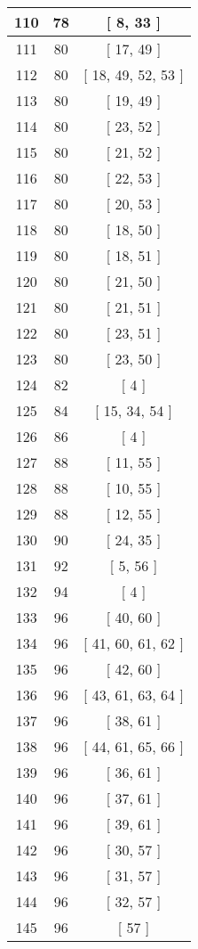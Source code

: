 \begin{center}
\begin{longtable}[H]{|| c c c ||}
\hline
110 & 78 & [ 8, 33 ] \\ 
\hline
111 & 80 & [ 17, 49 ] \\ 
\hline
112 & 80 & [ 18, 49, 52, 53 ] \\ 
\hline
113 & 80 & [ 19, 49 ] \\ 
\hline
114 & 80 & [ 23, 52 ] \\ 
\hline
115 & 80 & [ 21, 52 ] \\ 
\hline
116 & 80 & [ 22, 53 ] \\ 
\hline
117 & 80 & [ 20, 53 ] \\ 
\hline
118 & 80 & [ 18, 50 ] \\ 
\hline
119 & 80 & [ 18, 51 ] \\ 
\hline
120 & 80 & [ 21, 50 ] \\ 
\hline
121 & 80 & [ 21, 51 ] \\ 
\hline
122 & 80 & [ 23, 51 ] \\ 
\hline
123 & 80 & [ 23, 50 ] \\ 
\hline
124 & 82 & [ 4 ] \\ 
\hline
125 & 84 & [ 15, 34, 54 ] \\ 
\hline
126 & 86 & [ 4 ] \\ 
\hline
127 & 88 & [ 11, 55 ] \\ 
\hline
128 & 88 & [ 10, 55 ] \\ 
\hline
129 & 88 & [ 12, 55 ] \\ 
\hline
130 & 90 & [ 24, 35 ] \\ 
\hline
131 & 92 & [ 5, 56 ] \\ 
\hline
132 & 94 & [ 4 ] \\ 
\hline
133 & 96 & [ 40, 60 ] \\ 
\hline
134 & 96 & [ 41, 60, 61, 62 ] \\ 
\hline
135 & 96 & [ 42, 60 ] \\ 
\hline
136 & 96 & [ 43, 61, 63, 64 ] \\ 
\hline
137 & 96 & [ 38, 61 ] \\ 
\hline
138 & 96 & [ 44, 61, 65, 66 ] \\ 
\hline
139 & 96 & [ 36, 61 ] \\ 
\hline
140 & 96 & [ 37, 61 ] \\ 
\hline
141 & 96 & [ 39, 61 ] \\ 
\hline
142 & 96 & [ 30, 57 ] \\ 
\hline
143 & 96 & [ 31, 57 ] \\ 
\hline
144 & 96 & [ 32, 57 ] \\ 
\hline
145 & 96 & [ 57 ] \\ 

\end{longtable}
\end{center}
